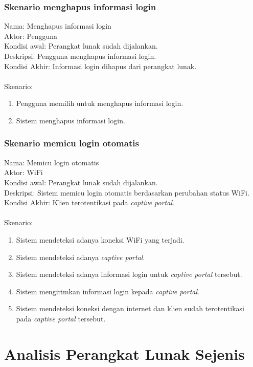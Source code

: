 \subsubsection{Skenario menghapus informasi login}
Nama: Menghapus informasi login\\
Aktor: Pengguna\\
Kondisi awal: Perangkat lunak sudah dijalankan.\\
Deskripsi: Pengguna menghapus informasi login.\\
Kondisi Akhir: Informasi login dihapus dari perangkat lunak.\\\\
Skenario:
\begin{enumerate}
    \item{Pengguna memilih untuk menghapus informasi login.}
    \item{Sistem menghapus informasi login.}
\end{enumerate}

\subsubsection{Skenario memicu login otomatis}
Nama: Memicu login otomatis\\
Aktor: WiFi\\
Kondisi awal: Perangkat lunak sudah dijalankan.\\
Deskripsi: Sistem memicu login otomatis berdasarkan perubahan status WiFi.\\
Kondisi Akhir: Klien terotentikasi pada \textit{captive portal}.\\\\
Skenario:
\begin{enumerate}
    \item{Sistem mendeteksi adanya koneksi WiFi yang terjadi.}
    \item{Sistem mendeteksi adanya \textit{captive portal}.}
    \item{Sistem mendeteksi adanya informasi login untuk \textit{captive portal} tersebut.}
    \item{Sistem mengirimkan informasi login kepada \textit{captive portal}.}
    \item{Sistem mendeteksi koneksi dengan internet dan klien sudah terotentikasi pada \textit{captive portal} tersebut.}
\end{enumerate}



\section{Analisis Perangkat Lunak Sejenis}
\label{sec:perangkat_lunak_sejenis}

